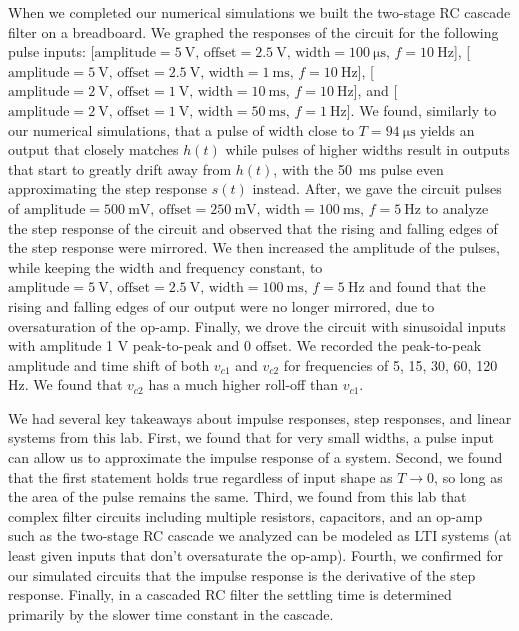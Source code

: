 \documentclass[12pt]{article}
\begin{document}
When we completed our numerical simulations we built the two-stage RC cascade filter on a breadboard. We graphed the responses of the circuit for the following pulse inputs: [\(\text{amplitude} = \qty{5}{\volt}, \, \text{offset} = \qty{2.5}{\volt}, \, \text{width} = \qty{100}{\micro\second}, \, f = \qty{10}{\hertz}\)], [\(\text{amplitude} = \qty{5}{\volt}, \, \text{offset} = \qty{2.5}{\volt}, \, \text{width} = \qty{1}{\milli\second}, \, f = \qty{10}{\hertz}\)], [\(\text{amplitude} = \qty{2}{\volt}, \, \text{offset} = \qty{1}{\volt}, \, \text{width} = \qty{10}{\milli\second}, \, f = \qty{10}{\hertz}\)], and [\(\text{amplitude} = \qty{2}{\volt}, \, \text{offset} = \qty{1}{\volt}, \, \text{width} = \qty{50}{\milli\second}, \, f = \qty{1}{\hertz}\)]. We found, similarly to our numerical simulations, that a pulse of width close to \(T = \qty{94}{\micro\second}\) yields an output that closely matches \(h(t)\) while pulses of higher widths result in outputs that start to greatly drift away from \(h(t)\), with the \qty{50}{\milli\second} pulse even approximating the step response \(s(t)\) instead. After, we gave the circuit pulses of \(\text{amplitude} = \qty{500}{\milli\volt}, \, \text{offset} = \qty{250}{\milli\volt}, \, \text{width} = \qty{100}{\milli\second}, \, f = \qty{5}{\hertz}\) to analyze the step response of the circuit and observed that the rising and falling edges of the step response were mirrored. We then increased the amplitude of the pulses, while keeping the width and frequency constant, to \(\text{amplitude} = \qty{5}{\volt}, \, \text{offset} = \qty{2.5}{\volt}, \, \text{width} = \qty{100}{\milli\second}, \, f = \qty{5}{\hertz}\) and found that the rising and falling edges of our output were no longer mirrored, due to oversaturation of the op-amp. Finally, we drove the circuit with sinusoidal inputs with amplitude 1 V peak-to-peak and 0 offset. We recorded the peak-to-peak amplitude and time shift of both \(v_{c1}\) and \(v_{c2}\) for frequencies of 5, 15, 30, 60, 120 Hz. We found that \(v_{c2}\) has a much higher roll-off than \(v_{c1}\).

We had several key takeaways about impulse responses, step responses, and linear systems from this lab. First, we found that for very small widths, a pulse input can allow us to approximate the impulse response of a system. Second, we found that the first statement holds true regardless of input shape as \(T \rightarrow 0\), so long as the area of the pulse remains the same. Third, we found from this lab that complex filter circuits including multiple resistors, capacitors, and an op-amp such as the two-stage RC cascade we analyzed can be modeled as LTI systems (at least given inputs that don't oversaturate the op-amp). Fourth, we confirmed for our simulated circuits that the impulse response is the derivative of the step response. Finally, in a cascaded RC filter the settling time is determined primarily by the slower time constant in the cascade.
\end{document}
